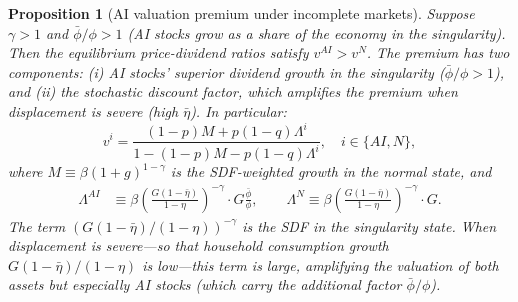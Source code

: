 \documentclass[12pt]{article}
\newtheorem{proposition}{Proposition}
\begin{document}
\begin{proposition}[AI valuation premium under incomplete markets] \label{prop:pd_ratios}
Suppose $\gamma > 1$ and $\bar{\phi}/\phi > 1$ (AI stocks grow as a share of the economy in the singularity). Then the equilibrium price-dividend ratios satisfy $v^{AI} > v^{N}$. The premium has two components: (i) AI stocks' superior dividend growth in the singularity ($\bar{\phi}/\phi > 1$), and (ii) the stochastic discount factor, which amplifies the premium when displacement is severe (high $\bar{\eta}$). In particular:
\begin{equation}
    v^{i} = \frac{(1-p) M + p(1-q) \Lambda^{i}}{1 - (1-p) M - p(1-q) \Lambda^{i}}, \quad i \in \{AI, N\}, \label{eq:v_i}
\end{equation}
where $M \equiv \beta(1+g)^{1-\gamma}$ is the SDF-weighted growth in the normal state, and
\begin{align}
    \Lambda^{AI} &\equiv \beta \left(\frac{G(1-\bar{\eta})}{1-\eta}\right)^{-\gamma} \cdot G \frac{\bar{\phi}}{\phi}, \qquad
    \Lambda^{N} \equiv \beta \left(\frac{G(1-\bar{\eta})}{1-\eta}\right)^{-\gamma} \cdot G. \label{eq:Lambda}
\end{align}
The term $(G(1-\bar{\eta})/(1-\eta))^{-\gamma}$ is the SDF in the singularity state. When displacement is severe---so that household consumption growth $G(1-\bar{\eta})/(1-\eta)$ is low---this term is large, amplifying the valuation of both assets but especially AI stocks (which carry the additional factor $\bar{\phi}/\phi$).
\end{proposition}
\end{document}
